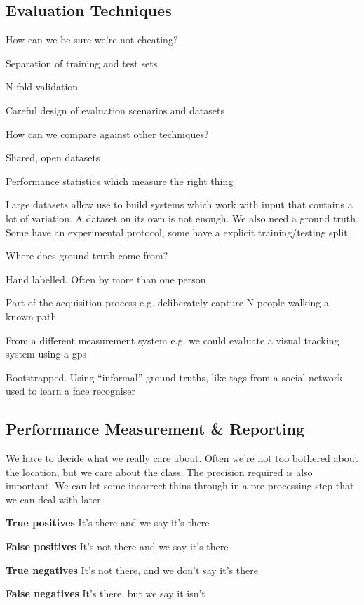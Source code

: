 \documentclass[8pt]{extarticle}
\begin{document}
\begin{multicols}{2}
\section{Evaluation Techniques}
How can we be sure we’re not cheating?
\begin{compactitem}
    \item Separation of training and test sets
    \item N-fold validation
    \item Careful design of evaluation scenarios and datasets
\end{compactitem}

How can we compare against other techniques?
\begin{compactitem}
    \item Shared, open datasets
    \item Performance statistics which measure the right thing
\end{compactitem}

Large datasets allow use to build systems which work with input that contains a lot of variation. A dataset on its own is not enough. We also need a ground truth. Some have an experimental protocol, some have a explicit training/testing split.

Where does ground truth come from?
\begin{compactitem}
\item Hand labelled. Often by more than one person
\item Part of the acquisition process e.g. deliberately capture N people walking a known path
\item From a different measurement system e.g. we could evaluate a visual tracking system using a gps
\item Bootstrapped. Using “informal” ground truths, like tags from a social network used to learn a face recogniser
\end{compactitem}

\subsection{Performance Measurement \& Reporting}
We have to decide what we really care about. Often we're not too bothered about the location, but we care about the class. The precision required is also important. We can let some incorrect thins through in a pre-processing step that we can deal with later.

\begin{compactitem}
\item \textbf{True positives} It’s there and we say it’s there
\item \textbf{False positives} It’s not there and we say it’s there
\item \textbf{True negatives} It’s not there, and we don’t say it’s there
\item \textbf{False negatives} It’s there, but we say it isn’t
\end{compactitem}


\end{multicols}
\end{document}

